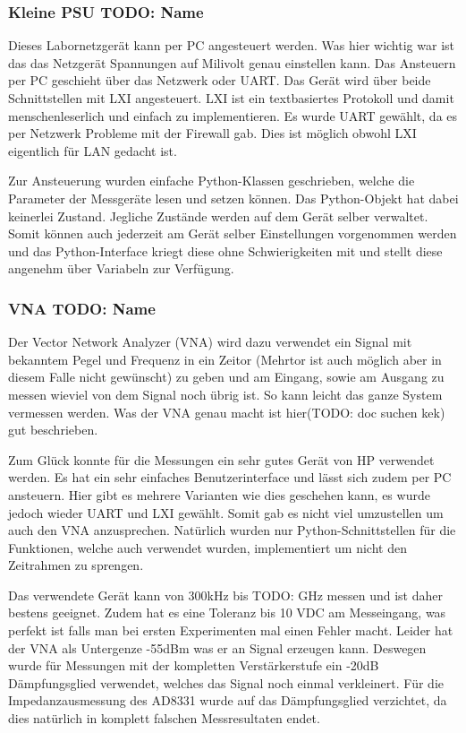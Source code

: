 \subsubsection*{Kleine PSU TODO: Name}
Dieses Labornetzgerät kann per PC angesteuert werden. Was hier wichtig war ist das das Netzgerät Spannungen auf Milivolt genau einstellen kann.
Das Ansteuern per PC geschieht über das Netzwerk oder UART. Das Gerät wird über beide Schnittstellen mit LXI angesteuert. LXI ist ein textbasiertes Protokoll und damit menschenleserlich und einfach zu implementieren. Es wurde UART gewählt, da es per Netzwerk Probleme mit der Firewall gab. Dies ist möglich obwohl LXI eigentlich für LAN gedacht ist.

Zur Ansteuerung wurden einfache Python-Klassen geschrieben, welche die Parameter der Messgeräte lesen und setzen können. Das Python-Objekt hat dabei keinerlei Zustand. Jegliche Zustände werden auf dem Gerät selber verwaltet. Somit können auch jederzeit am Gerät selber Einstellungen vorgenommen werden und das Python-Interface kriegt diese ohne Schwierigkeiten mit und stellt diese angenehm über Variabeln zur Verfügung.

\subsubsection*{VNA TODO: Name}
Der Vector Network Analyzer (VNA) wird dazu verwendet ein Signal mit bekanntem Pegel und Frequenz in ein Zeitor (Mehrtor ist auch möglich aber in diesem Falle nicht gewünscht) zu geben und am Eingang, sowie am Ausgang zu messen wieviel von dem Signal noch übrig ist. So kann leicht das ganze System vermessen werden. Was der VNA genau macht ist hier(TODO: doc suchen kek) gut beschrieben.

Zum Glück konnte für die Messungen ein sehr gutes Gerät von HP verwendet werden. Es hat ein sehr einfaches Benutzerinterface und lässt sich zudem per PC ansteuern. Hier gibt es mehrere Varianten wie dies geschehen kann, es wurde jedoch wieder UART und LXI gewählt. Somit gab es nicht viel umzustellen um auch den VNA anzusprechen. Natürlich wurden nur Python-Schnittstellen für die Funktionen, welche auch verwendet wurden, implementiert um nicht den Zeitrahmen zu sprengen.

Das verwendete Gerät kann von 300kHz bis TODO: GHz messen und ist daher bestens geeignet. Zudem hat es eine Toleranz bis 10 VDC am Messeingang, was perfekt ist falls man bei ersten Experimenten mal einen Fehler macht. Leider hat der VNA als Untergenze -55dBm was er an Signal erzeugen kann. Deswegen wurde für Messungen mit der kompletten Verstärkerstufe ein -20dB Dämpfungsglied verwendet, welches das Signal noch einmal verkleinert. Für die Impedanzausmessung des AD8331 wurde auf das Dämpfungsglied verzichtet, da dies natürlich in komplett falschen Messresultaten endet.

